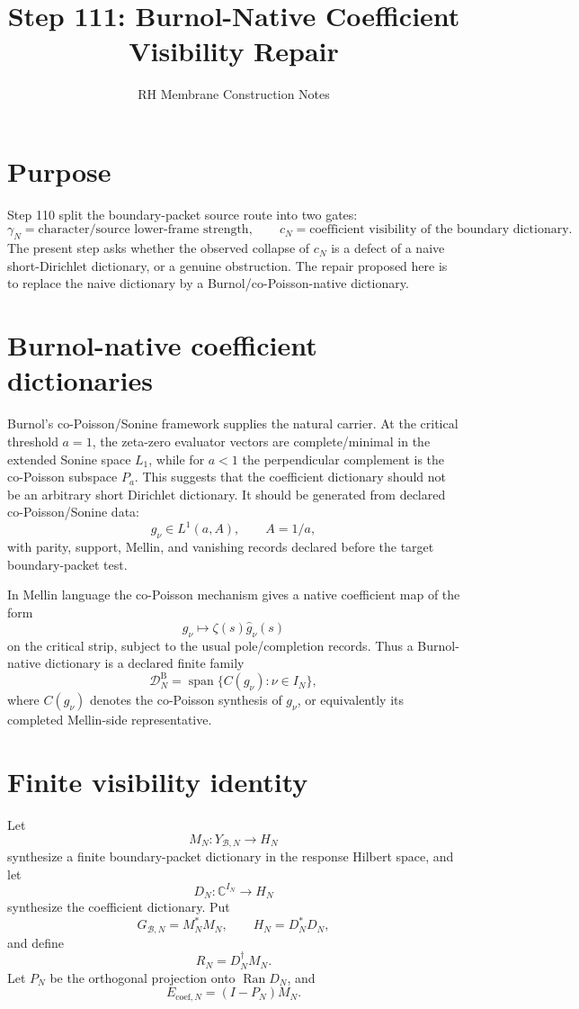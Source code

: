 \documentclass[11pt]{article}
\title{Step 111: Burnol-Native Coefficient Visibility Repair}
\author{RH Membrane Construction Notes}
\date{}
\begin{document}
\maketitle

\section{Purpose}

Step 110 split the boundary-packet source route into two gates:
\[
\gamma_N=\text{character/source lower-frame strength},
\qquad
c_N=\text{coefficient visibility of the boundary dictionary}.
\]
The present step asks whether the observed collapse of \(c_N\) is a defect of a
naive short-Dirichlet dictionary, or a genuine obstruction.  The repair proposed here
is to replace the naive dictionary by a Burnol/co-Poisson-native dictionary.

\section{Burnol-native coefficient dictionaries}

Burnol's co-Poisson/Sonine framework supplies the natural carrier.  At the critical
threshold \(a=1\), the zeta-zero evaluator vectors are complete/minimal in the
extended Sonine space \(L_1\), while for \(a<1\) the perpendicular complement is
the co-Poisson subspace \(P_a\).  This suggests that the coefficient dictionary should
not be an arbitrary short Dirichlet dictionary.  It should be generated from declared
co-Poisson/Sonine data:
\[
g_\nu\in L^1(a,A),\qquad A=1/a,
\]
with parity, support, Mellin, and vanishing records declared before the target
boundary-packet test.

In Mellin language the co-Poisson mechanism gives a native coefficient map of the
form
\[
g_\nu
\longmapsto
\zeta(s)\widehat g_\nu(s)
\]
on the critical strip, subject to the usual pole/completion records.  Thus a
Burnol-native dictionary is a declared finite family
\[
\mathcal D_N^{\mathrm{B}}
=
\operatorname{span}\{C(g_\nu):\nu\in I_N\},
\]
where \(C(g_\nu)\) denotes the co-Poisson synthesis of \(g_\nu\), or equivalently
its completed Mellin-side representative.

\section{Finite visibility identity}

Let
\[
M_N:Y_{\mathcal B,N}\to H_N
\]
synthesize a finite boundary-packet dictionary in the response Hilbert space, and let
\[
D_N:\mathbb C^{I_N}\to H_N
\]
synthesize the coefficient dictionary.  Put
\[
G_{\mathcal B,N}=M_N^*M_N,\qquad H_N=D_N^*D_N,
\]
and define
\[
R_N=D_N^\dagger M_N.
\]
Let \(P_N\) be the orthogonal projection onto \(\operatorname{Ran}D_N\), and
\[
E_{\mathrm{coef},N}=(I-P_N)M_N.
\]
\end{document}
